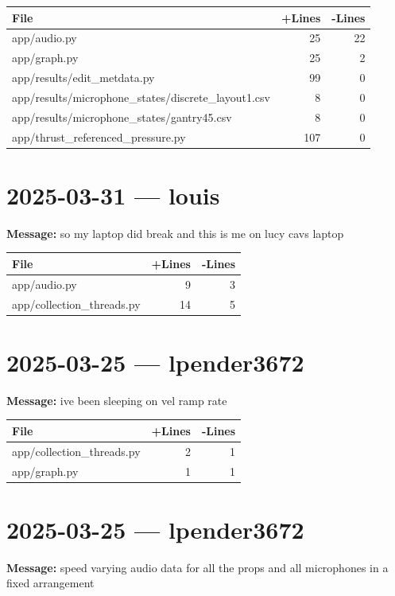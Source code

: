 \documentclass{article}
\begin{document}
\begin{longtable}{|p{10cm}|r|r|}
\hline \textbf{File} & \textbf{+Lines} & \textbf{-Lines} \\
\hline
app/audio.py & 25 & 22 \\
\hline
app/graph.py & 25 & 2 \\
\hline
app/results/edit\_metdata.py & 99 & 0 \\
\hline
app/results/microphone\_states/discrete\_layout1.csv & 8 & 0 \\
\hline
app/results/microphone\_states/gantry45.csv & 8 & 0 \\
\hline
app/thrust\_referenced\_pressure.py & 107 & 0 \\
\hline
\end{longtable}

\section*{2025-03-31 --- louis}
\textbf{Message:} so my laptop did break and this is me on lucy cavs laptop

\begin{longtable}{|p{10cm}|r|r|}
\hline \textbf{File} & \textbf{+Lines} & \textbf{-Lines} \\
\hline
app/audio.py & 9 & 3 \\
\hline
app/collection\_threads.py & 14 & 5 \\
\hline
\end{longtable}

\section*{2025-03-25 --- lpender3672}
\textbf{Message:} ive been sleeping on vel ramp rate

\begin{longtable}{|p{10cm}|r|r|}
\hline \textbf{File} & \textbf{+Lines} & \textbf{-Lines} \\
\hline
app/collection\_threads.py & 2 & 1 \\
\hline
app/graph.py & 1 & 1 \\
\hline
\end{longtable}

\section*{2025-03-25 --- lpender3672}
\textbf{Message:} speed varying audio data for all the props and all microphones in a fixed arrangement
\end{document}
